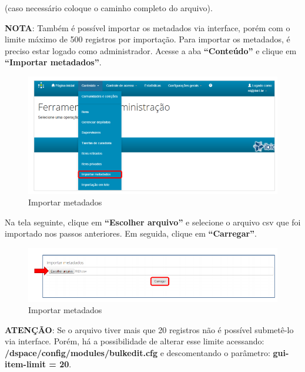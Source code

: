 \documentclass[12pt,hidelinks]{article}
\begin{document}
  
    (caso necessário coloque o caminho completo do arquivo).
    
\newpage
    
    \textbf{NOTA}: Também é possível importar os metadados via interface, porém com o limite máximo de 500 registros por importação. Para importar os metadados, é preciso estar logado como administrador. Acesse a aba \textbf{“Conteúdo”} e clique em \textbf{“Importar metadados”}.
    
    \begin{figure}[!htp]
                \centering
                \includegraphics[scale=0.8]{figura/Figura208.png}
                \caption{Importar metadados}
            \label{Rotulo}
        \end{figure}
    
    Na tela seguinte, clique em \textbf{“Escolher arquivo”} e selecione o arquivo csv que foi importado nos passos anteriores. Em seguida, clique em \textbf{“Carregar”}.
    
    \begin{figure}[!htp]
                \centering
                \includegraphics[scale=0.8]{figura/Figura209.png}
                \caption{Importar metadados}
            \label{Rotulo}
        \end{figure}

    
    \textbf{ATENÇÃO}: Se o arquivo tiver mais que 20 registros não é possível submetê-lo via interface. Porém, há a possibilidade de alterar esse limite acessando: \textbf{/dspace/config/modules/bulkedit.cfg} e descomentando o parâmetro: \textbf{gui-item-limit = 20}.
\end{document}
